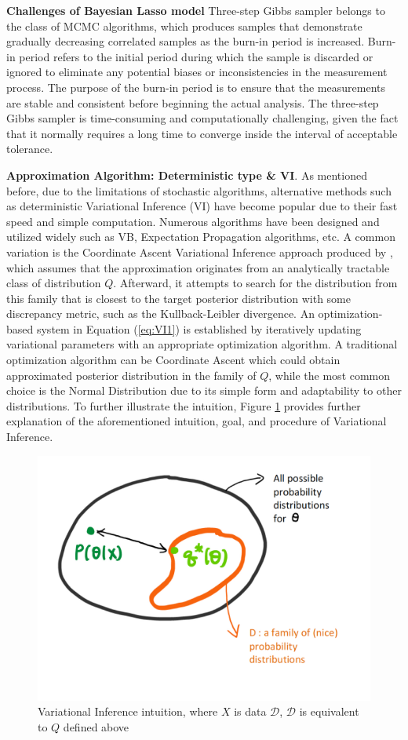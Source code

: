 \textbf{Challenges of Bayesian Lasso model}
Three-step Gibbs sampler belongs to the class of MCMC algorithms, which produces samples that demonstrate gradually decreasing correlated samples as the burn-in period is increased. Burn-in period refers to the initial period during which the sample is discarded or ignored to eliminate any potential biases or inconsistencies in the measurement process. The purpose of the burn-in period is to ensure that the measurements are stable and consistent before beginning the actual analysis. The three-step Gibbs sampler is time-consuming and computationally challenging, given the fact that it normally requires a long time to converge inside the interval of acceptable tolerance.

\textbf{Approximation Algorithm: Deterministic type \& VI}.
As mentioned before, due to the limitations of stochastic algorithms, alternative methods such as deterministic Variational Inference (VI) have become popular due to their fast speed and simple computation.
Numerous algorithms have been designed and utilized widely such as VB, Expectation Propagation algorithms, etc. A common variation is the Coordinate Ascent Variational Inference approach produced by \cite{Blei2003LDA}, which assumes that the approximation originates from an analytically tractable class of distribution $Q$. Afterward, it attempts to search for the distribution from this family that is closest to the target posterior distribution with some discrepancy metric, such as the Kullback-Leibler divergence. An optimization-based system in Equation (\ref{eq:VI1}) is established by iteratively updating variational parameters with an appropriate optimization algorithm. A traditional optimization algorithm can be Coordinate Ascent which could obtain approximated posterior distribution in the family of $Q$, while the most common choice is the Normal Distribution due to its simple form and adaptability to other distributions.
To further illustrate the intuition, Figure \ref{fig:VIoptimization} provides further explanation of the aforementioned intuition, goal, and procedure of Variational Inference.
\begin{figure}[H]
	\center
	\includegraphics[scale = 0.2]{VIoptimization}
	\caption{Variational Inference intuition, where $X$ is data $\mathcal{D}$, $\mathcal{D}$ is equivalent to $Q$ defined above}
	\label{fig:VIoptimization}
\end{figure}
